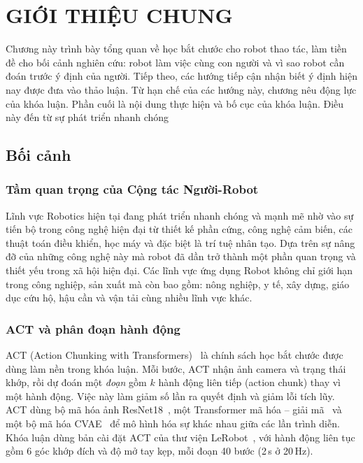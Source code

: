 \chapter{GIỚI THIỆU CHUNG}
\label{chap:introduction}

Chương này trình bày tổng quan về học bắt chước cho robot thao tác, làm tiền đề cho bối cảnh nghiên cứu: robot làm việc cùng con người và vì sao robot cần đoán trước ý định của người. Tiếp theo, các hướng tiếp cận nhận biết ý định hiện nay được đưa vào thảo luận. Từ hạn chế của các hướng này, chương nêu động lực của khóa luận. Phần cuối là nội dung thực hiện và bố cục của khóa luận. Điều này đến từ sự phát triển nhanh chóng 

\section{Bối cảnh}
\label{sec:intro-background}

\subsection{Tầm quan trọng của Cộng tác Người-Robot}

Lĩnh vực Robotics hiện tại đang phát triển nhanh chóng và mạnh mẽ nhờ vào sự tiến bộ trong công nghệ hiện đại từ thiết kế phần cứng, công nghệ cảm biến, các thuật toán điều khiển, học máy và đặc biệt là trí tuệ nhân tạo. Dựa trên sự nâng đỡ của những công nghệ này mà robot đã dần trở thành một phần quan trọng và thiết yếu trong xã hội hiện đại. Các lĩnh vực ứng dụng Robot không chỉ giới hạn trong công nghiệp, sản xuất mà còn bao gồm: nông nghiệp, y tế, xây dựng, giáo dục cứu hộ, hậu cần và vận tải cùng nhiều lĩnh vực khác. 
 
\subsection{ACT và phân đoạn hành động}

ACT (Action Chunking with Transformers)~\cite{zhao2023act} là chính sách học bắt chước được dùng làm nền trong khóa luận. Mỗi bước, ACT nhận ảnh camera và trạng thái khớp, rồi dự đoán một \emph{đoạn} gồm $k$ hành động liên tiếp (action chunk) thay vì một hành động. Việc này làm giảm số lần ra quyết định và giảm lỗi tích lũy. ACT dùng bộ mã hóa ảnh ResNet18~\cite{he2016resnet}, một Transformer mã hóa -- giải mã~\cite{vaswani2017attention} và một bộ mã hóa CVAE~\cite{sohn2015cvae} để mô hình hóa sự khác nhau giữa các lần trình diễn. Khóa luận dùng bản cài đặt ACT của thư viện LeRobot~\cite{cadene2026lerobot}, với hành động liên tục gồm 6 góc khớp đích và độ mở tay kẹp, mỗi đoạn 40 bước (2\,s ở 20\,Hz).


